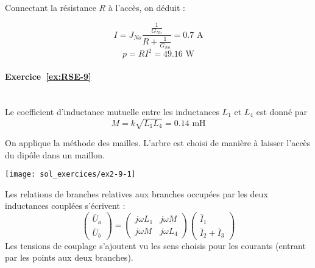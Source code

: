 \pagebreak


Connectant la résistance  $R$ à l'accès, on déduit :

\[I=J_{No}\frac{\frac{1}{G_{No}}}{R+\frac{1}{G_{No}}}=0.7 \text{~A}\]
\[p=RI^2=49.16 \text{~W}\]

\paragraph{Exercice~\ref{ex:RSE-9}}~\\%
Le coefficient d'inductance mutuelle entre les inductances $L_1$ et
$L_4$ est donné par
\[M=k\sqrt{L_1L_4}=0.14\text{~mH}\]

On applique la méthode des mailles. L'arbre est choisi de manière à
laisser l'accès du dipôle dans un maillon. 
\begin{center}
	\texttt{[image: sol\_exercices/ex2-9-1]}
\end{center}
Les relations de branches relatives aux branches occupées par les deux
inductances couplées s'écrivent :
\[\begin{pmatrix}
\bar{U}_a\\
\bar{U}_b
\end{pmatrix} =
\begin{pmatrix}
j\omega L_1 & j\omega M\\
j\omega M & j\omega L_4
\end{pmatrix}
\begin{pmatrix}
\bar{I}_1\\
\bar{I}_2+\bar{I}_3
\end{pmatrix}\]
Les tensions de couplage s'ajoutent vu les sens choisis pour les
courants (entrant par les points aux deux branches).

